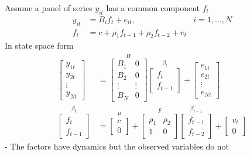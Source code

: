 \documentclass[
  letterpaper,
]{book}
\begin{document}
Assume a panel of series \(y_{it}\) has a common component \(f_t\) \[
\begin{align}
    y_{it} &= B_i f_t + e_{it}, \qquad &i=1,\ldots ,N \\
    f_t    &= c+\rho_1 f_{t-1} + \rho_2 f_{t-2} + v_t
\end{align}
\] In state space form \[
    \begin{align*}
    \left[ 
    \begin{array}{c}y_{1t} \\ y_{2t} \\ \vdots \\ y_{Nt}\end{array}\right] &= 
    \overset{H}{\left[ \begin{array}{cc}B_1 & 0 \\ B_2 & 0 \\ \vdots & \vdots \\ B_N & 0\end{array}\right] }
    \overset{\beta_t}{\left[ \begin{array}{c}f_t \\ f_{t-1} \end{array}\right] } + \left[ \begin{array}{c} e_{1t} \\ e_{2t} \\ \vdots \\ e_{Nt} \end{array}\right] \\
    \overset{\beta_t}{\left[ \begin{array}{c} f_t  \\ f_{t-1} \end{array}\right] } &=
    \overset{\mu }{\left[  \begin{array}{c}c \\ 0 \end{array} \right] }+
    \overset{F}{\left[ \begin{array}{cc}
    \rho_1 & \rho_2 \\  1 & 0 \end{array} \right] }
    \overset{\beta_{t-1}}{\left[  \begin{array}{c} f_{t-1} \\ f_{t-2} \end{array} \right] }+\left[ \begin{array}{c} v_t \\ 0\end{array}
    \right]
    \end{align*}
\] - The factors have dynamics but the observed variables do not
\end{document}
